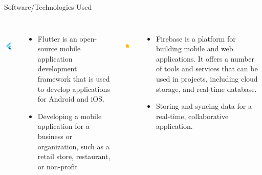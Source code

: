 \documentclass{beamer}
\begin{document}
\begin{frame}{Software/Technologies Used}
    \begin{columns}
            \centering\includegraphics[height=2cm, width=3cm]{flutter.jpg}
            \begin{itemize}
    
                \item Flutter is an open-source mobile application development framework that is used to develop applications for Android and iOS.
                \item Developing a mobile application for a business or organization, such as a retail store, restaurant, or non-profit
            \end{itemize}

            \centering\includegraphics[height=2cm, width=3cm]{firebase.png}
            \begin{itemize}
                \item Firebase is a platform for building mobile and web applications. It offers a number of tools and services that can be used in projects, including cloud storage, and real-time database. 
                \item Storing and syncing data for a real-time, collaborative application.

            \end{itemize}
    \end{columns}
\end{frame}
\end{document}
